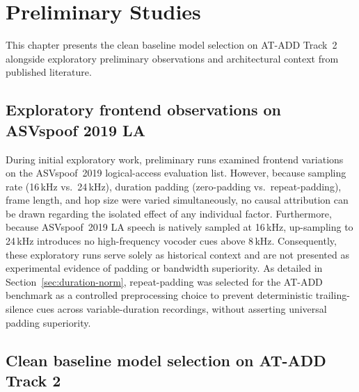 \chapter{Preliminary Studies}
\label{ch:prelim}

This chapter presents the clean baseline model selection on AT-ADD Track~2 alongside exploratory preliminary observations and architectural context from published literature.

\section{Exploratory frontend observations on ASVspoof 2019 LA}
\label{sec:frontend-study}

During initial exploratory work, preliminary runs examined frontend variations on the ASVspoof~2019 logical-access evaluation list. However, because sampling rate (16\,kHz vs.\ 24\,kHz), duration padding (zero-padding vs.\ repeat-padding), frame length, and hop size were varied simultaneously, no causal attribution can be drawn regarding the isolated effect of any individual factor. Furthermore, because ASVspoof~2019 LA speech is natively sampled at 16\,kHz, up-sampling to 24\,kHz introduces no high-frequency vocoder cues above 8\,kHz. Consequently, these exploratory runs serve solely as historical context and are not presented as experimental evidence of padding or bandwidth superiority. As detailed in Section~\ref{sec:duration-norm}, repeat-padding was selected for the AT-ADD benchmark as a controlled preprocessing choice to prevent deterministic trailing-silence cues across variable-duration recordings, without asserting universal padding superiority.

\section{Clean baseline model selection on AT-ADD Track 2}
\label{sec:backbone-study}

